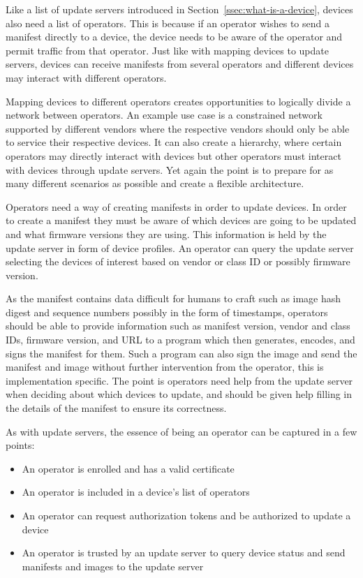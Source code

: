 \documentclass[0-thesis.tex]{subfiles}
\begin{document}
Like a list of update servers introduced in Section~\ref{ssec:what-is-a-device}, devices
also need a list of operators. This is because if an operator wishes to send a manifest
directly to a device, the device needs to be aware of the operator and permit traffic from
that operator. Just like with mapping devices to update servers, devices can receive
manifests from several operators and different devices may interact with different
operators. 

Mapping devices to different operators creates opportunities to logically divide a network
between operators. An example use case is a constrained network supported by different
vendors where the respective vendors should only be able to service their respective
devices. It can also create a hierarchy, where certain operators may directly interact
with devices but other operators must interact with devices through update servers. Yet
again the point is to prepare for as many different scenarios as possible and create a
flexible architecture.

Operators need a way of creating manifests in order to update devices. In order to create
a manifest they must be aware of which devices are going to be updated and what firmware
versions they are using. This information is held by the update server in form of device
profiles. An operator can query the update server selecting the devices of interest based
on vendor or class ID or possibly firmware version. 

As the manifest contains data difficult for humans to craft such as image hash digest and
sequence numbers possibly in the form of timestamps, operators should be able to provide
information such as manifest version, vendor and class IDs, firmware version, and URL to a
program which then generates, encodes, and signs the manifest for them. Such a program can
also sign the image and send the manifest and image without further intervention from the
operator, this is implementation specific. The point is operators need help from the
update server when deciding about which devices to update, and should be given help
filling in the details of the manifest to ensure its correctness.

As with update servers, the essence of being an operator can be captured in a few points:

\begin{itemize}
    \item An operator is enrolled and has a valid certificate
    \item An operator is included in a device's list of operators
    \item An operator can request authorization tokens and be authorized to update a
            device
    \item An operator is trusted by an update server to query device status and send
            manifests and images to the update server
\end{itemize}
\end{document}
